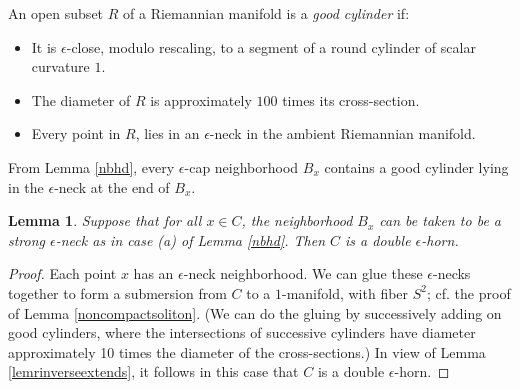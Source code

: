 \documentclass[12pt]{amsart}
\newcommand{\eps}{\epsilon}
\numberwithin{equation}{section}
\theoremstyle{plain}
\newtheorem{lemma}[equation]{Lemma}
\theoremstyle{definition}
\theoremstyle{remark}
\begin{document}
An open subset $R$ of a Riemannian manifold is a {\em good cylinder} if:

\begin{itemize}
\item It is
$\eps$-close, modulo rescaling, to a segment of a round
cylinder of scalar curvature $1$.

\item The diameter of $R$ is approximately
$100$ times its cross-section.

\item Every point in $R$, lies
in an $\eps$-neck in the ambient Riemannian manifold.
\end{itemize}
From Lemma \ref{nbhd},
every $\eps$-cap neighborhood $B_x$
contains a good cylinder lying in the $\eps$-neck at the end
of $B_x$.   


\begin{lemma} \label{doublehorn}
Suppose that for all $x \in C$, 
the neighborhood $B_x$ can be taken to be a strong
$\epsilon$-neck as in case (a) of Lemma \ref{nbhd}. 
Then $C$ is a double $\epsilon$-horn.
\end{lemma}
\begin{proof}
Each point $x$ has an $\epsilon$-neck neighborhood.
We can glue these $\epsilon$-necks together to form a
submersion from $C$ to a $1$-manifold, with fiber $S^2$;
cf. the proof of Lemma \ref{noncompactsoliton}. (We can 
do the gluing by successively adding on good
cylinders, where the intersections of successive cylinders 
have diameter approximately 10 times the diameter of the cross-sections.) 
In view of Lemma
\ref{lemrinverseextends}, it follows in this case that
$C$ is a double $\epsilon$-horn.
\end{proof}
\end{document}
